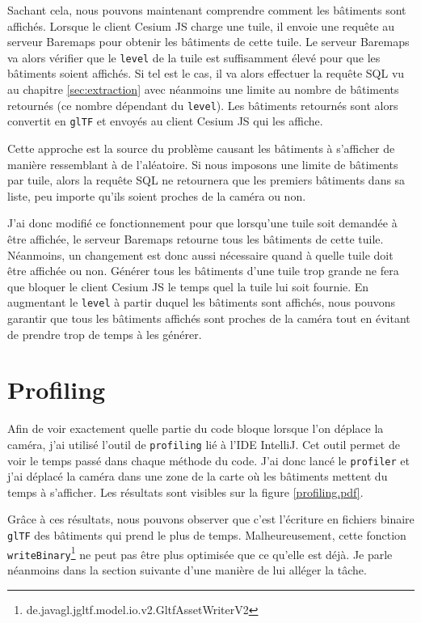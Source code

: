 Sachant cela, nous pouvons maintenant comprendre comment les bâtiments sont affichés. Lorsque le client Cesium JS charge une tuile, il envoie une requête au serveur Baremaps pour obtenir les bâtiments de cette tuile. Le serveur Baremaps va alors vérifier que le \texttt{level} de la tuile est suffisamment élevé pour que les bâtiments soient affichés. Si tel est le cas, il va alors effectuer la requête SQL vu au chapitre \ref{sec:extraction} avec néanmoins une limite au nombre de bâtiments retournés (ce nombre dépendant du \texttt{level}). Les bâtiments retournés sont alors convertit en \texttt{glTF} et envoyés au client Cesium JS qui les affiche.

Cette approche est la source du problème causant les bâtiments à s'afficher de manière ressemblant à de l'aléatoire. Si nous imposons une limite de bâtiments par tuile, alors la requête SQL ne retournera que les premiers bâtiments dans sa liste, peu importe qu'ils soient proches de la caméra ou non.

J'ai donc modifié ce fonctionnement pour que lorsqu'une tuile soit demandée à être affichée, le serveur Baremaps retourne tous les bâtiments de cette tuile. Néanmoins, un changement est donc aussi nécessaire quand à quelle tuile doit être affichée ou non. Générer tous les bâtiments d'une tuile trop grande ne fera que bloquer le client Cesium JS le temps quel la tuile lui soit fournie. En augmentant le \texttt{level} à partir duquel les bâtiments sont affichés, nous pouvons garantir que tous les bâtiments affichés sont proches de la caméra tout en évitant de prendre trop de temps à les générer.

\newpage
\section{Profiling}

Afin de voir exactement quelle partie du code bloque lorsque l'on déplace la caméra, j'ai utilisé l'outil de \texttt{profiling} lié à l'IDE IntelliJ. Cet outil permet de voir le temps passé dans chaque méthode du code. J'ai donc lancé le \texttt{profiler} et j'ai déplacé la caméra dans une zone de la carte où les bâtiments mettent du temps à s'afficher. Les résultats sont visibles sur la figure \ref{profiling.pdf}.


Grâce à ces résultats, nous pouvons observer que c'est l'écriture en fichiers binaire \texttt{glTF} des bâtiments qui prend le plus de temps. Malheureusement, cette fonction \texttt{writeBinary}\footnote{de.javagl.jgltf.model.io.v2.GltfAssetWriterV2} ne peut pas être plus optimisée que ce qu'elle est déjà. Je parle néanmoins dans la section suivante d'une manière de lui alléger la tâche.

